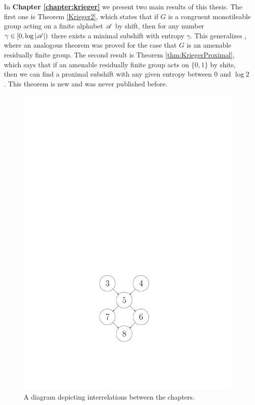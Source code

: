 In {\bf Chapter \ref{chapter:krieger}} we present two main results of this thesis. The first one is Theorem \ref{Krieger2}, which states that if $G$ is a congruent monotileable group acting on a finite alphabet $\mathscr{A}$ by shift, then for any number $\gamma\in[0,\log|\mathscr{A}|)$ there exists a minimal subshift with entropy $\gamma$. This generalizes \cite{LS18}, where an analogous theorem was proved for the case that $G$ is an amenable residually finite group. The second result is Theorem \ref{thm:KriegerProximal}, which says that if an amenable residually finite group acts on $\{0,1\}$ by shits, then we can find a proximal subshift with any given entropy between $0$ and $\log2$. This theorem is new and was never published before.
\bigskip\bigskip\bigskip
\begin{figure}[H]
\centering
\includegraphics[scale=1]{../Graphics/chapters.pdf}
\caption{A diagram depicting interrelations between the chapters.}\label{fig:chapters}
\end{figure}



